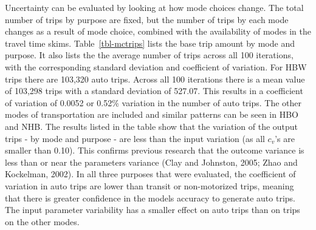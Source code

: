 \documentclass[
  futuretransp,
  submit,
  moreauthors,
]{Definitions/mdpi}
\begin{document}
Uncertainty can be evaluated by looking at how mode choices change. The
total number of trips by purpose are fixed, but the number of trips by
each mode changes as a result of mode choice, combined with the
availability of modes in the travel time skims. Table~\ref{tbl-mctrips}
lists the base trip amount by mode and purpose. It also lists the the
average number of trips across all 100 iterations, with the
corresponding standard deviation and coefficient of variation. For HBW
trips there are 103,320 auto trips. Across all 100 iterations there is a
mean value of 103,298 trips with a standard deviation of 527.07. This
results in a coefficient of variation of 0.0052 or 0.52\% variation in
the number of auto trips. The other modes of transportation are included
and similar patterns can be seen in HBO and NHB. The results listed in
the table show that the variation of the output trips - by mode and
purpose - are less than the input variation (as all \(c_v\)'s are
smaller than 0.10). This confirms previous research that the outcome
variance is less than or near the parameters variance (Clay and
Johnston, 2005; Zhao and Kockelman, 2002). In all three purposes that
were evaluated, the coefficient of variation in auto trips are lower
than transit or non-motorized trips, meaning that there is greater
confidence in the models accuracy to generate auto trips. The input
parameter variability has a smaller effect on auto trips than on trips
on the other modes.
\end{document}
